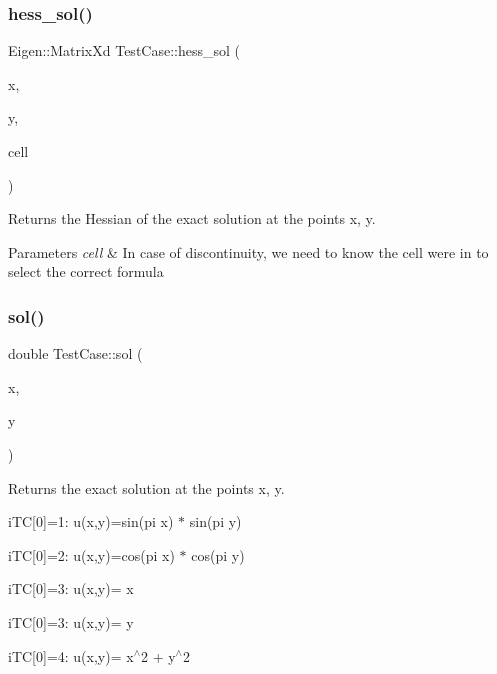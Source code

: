 \subsubsection{\texorpdfstring{hess\+\_\+sol()}{hess\_sol()}}
{\footnotesize\ttfamily Eigen\+::\+Matrix\+Xd Test\+Case\+::hess\+\_\+sol (\begin{DoxyParamCaption}\item[{const double}]{x,  }\item[{const double}]{y,  }\item[{const \hyperlink{classHArDCore2D_1_1Cell}{Cell} $\ast$}]{cell }\end{DoxyParamCaption})}



Returns the Hessian of the exact solution at the points x, y. 


\begin{DoxyParams}{Parameters}
{\em cell} & In case of discontinuity, we need to know the cell we\textquotesingle{}re in to select the correct formula \\
\hline
\end{DoxyParams}
\mbox{\label{classTestCase_aede719dac81c460c713d930a379c537e}} 
\subsubsection{\texorpdfstring{sol()}{sol()}}
{\footnotesize\ttfamily double Test\+Case\+::sol (\begin{DoxyParamCaption}\item[{const double}]{x,  }\item[{const double}]{y }\end{DoxyParamCaption})}



Returns the exact solution at the points x, y. 

i\+TC\mbox{[}0\mbox{]}=1\+: u(x,y)=sin(pi x) $\ast$ sin(pi y)

i\+TC\mbox{[}0\mbox{]}=2\+: u(x,y)=cos(pi x) $\ast$ cos(pi y)

i\+TC\mbox{[}0\mbox{]}=3\+: u(x,y)= x

i\+TC\mbox{[}0\mbox{]}=3\+: u(x,y)= y

i\+TC\mbox{[}0\mbox{]}=4\+: u(x,y)= x$^\wedge$2 + y$^\wedge$2 \mbox{\label{classTestCase_a5b2e54e9f17ac2ec9c1d675f97fbe335}} 
